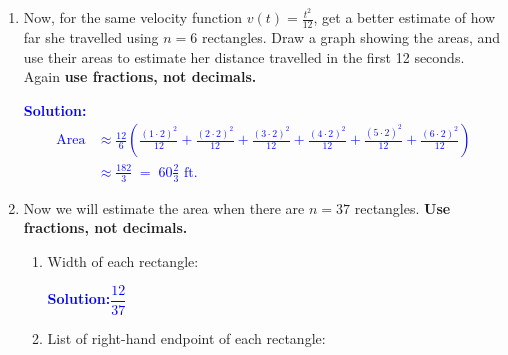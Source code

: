 \documentclass[letterpaper,11pt]{article}
\newcommand{\sol}[2]{\begin{minipage}[c][#1]{\linewidth}{\textcolor{blue}{\textbf{Solution:}}\quad \textcolor{blue}{#2}}\end{minipage}}
\newcommand{\opsol}[1]{#1}
\newcommand{\sol}[2]{\begin{minipage}[c][#1]{\linewidth}{\vfill}\end{minipage}}
\newcommand{\opsol}[1]{0}
\begin{document}
\begin{enumerate}
\newpage

\item Now, for the same velocity function $v(t)=\frac{t^2}{12}$, get a better estimate of how far she travelled using $n=6$ rectangles. Draw a graph showing the areas, and use their areas to estimate her distance travelled in the first 12 seconds.
Again {\bf use fractions, not decimals.}

\begin{center}
\end{center}

\sol{1 in}{
\begin{align*}
\text{Area} &\approx \frac{12}{6} \left( \frac{(1 \cdot 2)^2}{12}+\frac{(2 \cdot 2)^2}{12}+\frac{(3 \cdot 2)^2}{12}+\frac{(4 \cdot 2)^2}{12}+\frac{(5 \cdot 2)^2}{12}+\frac{(6 \cdot 2)^2}{12} \right) \\
&\approx \frac{182}{3} \;=\; 60\frac{2}{3} \text{ ft.}
\end{align*}
}

\item  Now we will estimate the area when there are $n=37$ rectangles. 
{\bf Use fractions, not decimals.}

\begin{enumerate}
\item Width of each rectangle: 

\sol{.4 in}{$\dfrac{12}{37}$}

\item List of right-hand endpoint of each rectangle:\\ 


\end{enumerate}
\end{enumerate}
\end{document}
